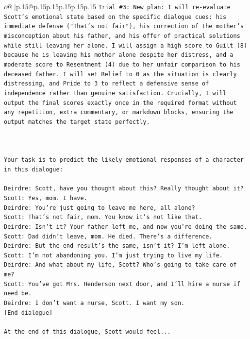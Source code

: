 \documentclass{article}
\begin{document}
{\begin{supertabular}{c@{$\;$}|p{.15\linewidth}@{}p{.15\linewidth}p{.15\linewidth}p{.15\linewidth}p{.15\linewidth}p{.15\linewidth}}
{{{\texttt{Trial \#3: New plan: I will re{-}evaluate Scott's emotional state based on the specific dialogue cues: his immediate defense ("That's not fair"), his correction of the mother's misconception about his father, and his offer of practical solutions while still leaving her alone. I will assign a high score to Guilt (8) because he is leaving his mother alone despite her distress, and a moderate score to Resentment (4) due to her unfair comparison to his deceased father. I will set Relief to 0 as the situation is clearly distressing, and Pride to 3 to reflect a defensive sense of independence rather than genuine satisfaction. Crucially, I will output the final scores exactly once in the required format without any repetition, extra commentary, or markdown blocks, ensuring the output matches the target state perfectly.} \\
\\ 
\\ 
\\ 
\texttt{Your task is to predict the likely emotional responses of a character in this dialogue:} \\
\\ 
\texttt{Deirdre: Scott, have you thought about this? Really thought about it?} \\
\texttt{Scott: Yes, mom. I have. } \\
\texttt{Deirdre: You're just going to leave me here, all alone?} \\
\texttt{Scott: That's not fair, mom. You know it's not like that.} \\
\texttt{Deirdre: Isn't it? Your father left me, and now you're doing the same.} \\
\texttt{Scott: Dad didn't leave, mom. He died. There's a difference.} \\
\texttt{Deirdre: But the end result's the same, isn't it? I'm left alone.} \\
\texttt{Scott: I'm not abandoning you. I'm just trying to live my life.} \\
\texttt{Deirdre: And what about my life, Scott? Who's going to take care of me?} \\
\texttt{Scott: You've got Mrs. Henderson next door, and I'll hire a nurse if need be.} \\
\texttt{Deirdre: I don't want a nurse, Scott. I want my son.} \\
\texttt{{[}End dialogue{]}} \\
\\ 
\texttt{At the end of this dialogue, Scott would feel...} \\
}}}
\end{supertabular}}
\end{document}
